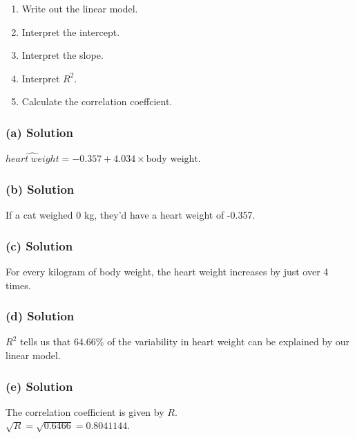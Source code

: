 \documentclass[]{article}
\providecommand{\tightlist}{%
  \setlength{\itemsep}{0pt}\setlength{\parskip}{0pt}}
\begin{document}
\begin{enumerate}
\def\labelenumi{(\alph{enumi})}
\tightlist
\item
  Write out the linear model.\\
\item
  Interpret the intercept.\\
\item
  Interpret the slope.\\
\item
  Interpret \(R^2\).\\
\item
  Calculate the correlation coeffcient.
\end{enumerate}

\subsubsection{(a) Solution}\label{a-solution-2}

\(\widehat{heart \ weight} = -0.357 + 4.034 \times \text{body weight}\).

\subsubsection{(b) Solution}\label{b-solution-2}

If a cat weighed 0 kg, they'd have a heart weight of -0.357.

\subsubsection{(c) Solution}\label{c-solution-2}

For every kilogram of body weight, the heart weight increases by just
over 4 times.

\subsubsection{(d) Solution}\label{d-solution-2}

\(R^2\) tells us that 64.66\% of the variability in heart weight can be
explained by our linear model.

\subsubsection{(e) Solution}\label{e-solution-1}

The correlation coefficient is given by \(R\).\\
\(\sqrt{R} = \sqrt{0.6466} = 0.8041144\).
\end{document}
